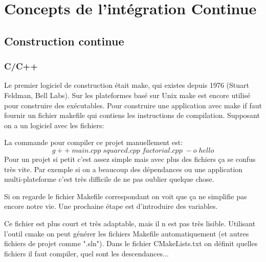 \section{Concepts de l'intégration Continue}

\subsection{Construction continue}
\subsubsection{C/C++}
Le premier logiciel de construction était make, qui existes depuis 1976 (Stuart Feldman, Bell Labs). Sur les plateformes basé sur Unix make est encore utilisé pour construire des exécutables.
Pour construire une application avec make if faut fournir un fichier makefile qui contiens les instructions de compilation. Supposant on a un logiciel avec les fichiers: 






La commande pour compiler ce projet manuellement est:
$$g++\;main.cpp\;squared.cpp\;factorial.cpp\;-o\;hello$$
Pour un projet si petit c'est assez simple mais avec plus des fichiers ça se confus très vite.
Par exemple si on a beaucoup des dépendances ou une application multi-plateforme c'est très difficile de ne pas oublier quelque chose.
\newpage

Si on regarde le fichier Makefile correspondant on voit que ça ne simplifie pas encore notre vie. Une prochaine étape est d'introduire des variables.


Ce fichier est plus court et très adaptable, mais il n est pas très lisible.
Utilisant l'outil cmake on peut générer les fichiers Makefile automatiquement (et autres fichiers de projet comme ".sln").
Dans le fichier CMakeLists.txt on définit quelles fichiers il faut compiler, quel sont les descendances...



